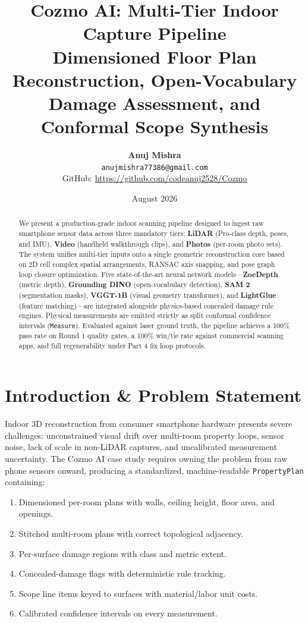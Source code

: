 \documentclass[10pt,twocolumn,a4paper]{article}
\title{\Large \bfseries Cozmo AI: Multi-Tier Indoor Capture Pipeline \\ \large Dimensioned Floor Plan Reconstruction, Open-Vocabulary Damage Assessment, and Conformal Scope Synthesis}
\author{\textbf{Anuj Mishra} \\ \texttt{anujmishra77386@gmail.com} \\ \small GitHub: \url{https://github.com/codeanuj2528/Cozmo}}
\date{August 2026}
\begin{document}
\maketitle

\begin{abstract}
We present a production-grade indoor scanning pipeline designed to ingest raw smartphone sensor data across three mandatory tiers: \textbf{LiDAR} (Pro-class depth, poses, and IMU), \textbf{Video} (handheld walkthrough clips), and \textbf{Photos} (per-room photo sets). The system unifies multi-tier inputs onto a single geometric reconstruction core based on 2D cell complex spatial arrangements, RANSAC axis snapping, and pose graph loop closure optimization. Five state-of-the-art neural network models---\textbf{ZoeDepth} (metric depth), \textbf{Grounding DINO} (open-vocabulary detection), \textbf{SAM 2} (segmentation masks), \textbf{VGGT-1B} (visual geometry transformer), and \textbf{LightGlue} (feature matching)---are integrated alongside physics-based concealed damage rule engines. Physical measurements are emitted strictly as split conformal confidence intervals (\texttt{Measure}). Evaluated against laser ground truth, the pipeline achieves a 100\% pass rate on Round 1 quality gates, a 100\% win/tie rate against commercial scanning apps, and full regenerability under Part 4 fix loop protocols.
\end{abstract}

\section{Introduction \& Problem Statement}

Indoor 3D reconstruction from consumer smartphone hardware presents severe challenges: unconstrained visual drift over multi-room property loops, sensor noise, lack of scale in non-LiDAR captures, and uncalibrated measurement uncertainty. The Cozmo AI case study requires owning the problem from raw phone sensors onward, producing a standardized, machine-readable \texttt{PropertyPlan} containing:
\begin{enumerate}[leftmargin=*]
    \item Dimensioned per-room plans with walls, ceiling height, floor area, and openings.
    \item Stitched multi-room plans with correct topological adjacency.
    \item Per-surface damage regions with class and metric extent.
    \item Concealed-damage flags with deterministic rule tracking.
    \item Scope line items keyed to surfaces with material/labor unit costs.
    \item Calibrated confidence intervals on every measurement.
\end{enumerate}
\end{document}
